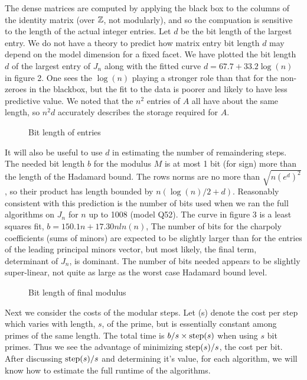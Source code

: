 \documentclass{acm_proc_article-sp}
\begin{document}
The dense matrices are computed by applying the black box to the columns of the 
identity matrix (over $\mathbb Z$, not modularly), and so the compuation is 
sensitive to the length of the 
actual integer entries.
Let $d$ be the bit length of the 
largest entry.  
We do not have a theory to predict how matrix entry bit length $d$ may depend on the 
model dimension for a fixed facet. 
We have plotted the bit length $d$ of the largest entry of $J_n$ along with
the fitted curve $d = 67.7 + 33.2\log(n)$ in figure 2.  
One sees the $\log(n)$ playing a stronger role than that for the non-zeroes in the blackbox,
but the fit to the data is poorer and likely to have less predictive value.
We noted that the $n^2$ entries of $A$ all have about the same length, so $n^2 d$ accurately
describes the storage required for $A$.
\begin{figure}[h] %
\caption{Bit length of entries}
\end{figure}

It will also be useful to use $d$ in estimating the number of remaindering steps.
The needed bit length $b$ for the modulus $M$ is at most 1 bit (for sign) more 
than the length of the Hadamard bound.  The rows norms are no more than \(\sqrt{n(e^d)^2}\),
so their product has length bounded by $n(\log(n)/2 + d)$.
Reasonably consistent with this prediction is the number of bits used when we ran
the full algorithms on $J_n$ for $n$ up to 1008 (model Q52).  
The curve in figure 3 is a least squares fit,
$b = 150.1 n + 17.30n ln(n)$,
The number of bits for the charpoly coefficients (sums of minors) are expected 
to be slightly larger than for the entries of the  leading principal minors vector,
but most likely, the final term, determinant of $J_n$, is dominant.  
The number of bits needed appears to be slightly super-linear, not quite as large as
the worst case Hadamard bound level.  
\begin{figure}[h] %
\caption{Bit length of final modulus}
\end{figure}

Next we consider the costs of the modular steps.
Let \step(s) denote the cost per step which varies with length, $s$, of the prime, 
but is essentially constant among primes of the same length.
The total time  is $b/s \times \mbox{step}(s)$ when using $s$ bit primes. 
Thus we see the advantage of minimizing $\mbox{step}(s)/s$, the cost per bit.
After discussing $\mbox{step}(s)/s$ and determining it's value, for each algorithm,  
we will know how to estimate the full runtime of the algorithms.
\end{document}
